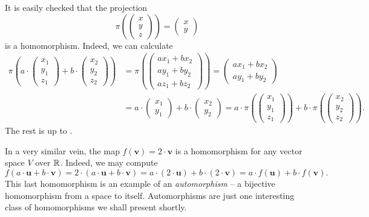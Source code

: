 It is easily checked that the projection
\[
 \pi \left( 
  \begin{pmatrix}
   x\\
   y\\
   z
  \end{pmatrix}
 \right) = 
 \begin{pmatrix}
  x\\
  y
 \end{pmatrix}
\]
is a homomorphism. Indeed, we can calculate
\begin{align*}
 \pi \left( a \cdot 
 \begin{pmatrix}
  x_1\\
  y_1\\
  z_1
 \end{pmatrix} + b \cdot 
 \begin{pmatrix}
  x_2\\
  y_2\\
  z_2
 \end{pmatrix}
\right) &= 
 \pi \left( 
 \begin{pmatrix}
  ax_1 + bx_2\\
  ay_1 + by_2\\
  az_1 + bz_2
 \end{pmatrix}
 \right) = 
 \begin{pmatrix}
  ax_1 + bx_2\\
  ay_1 + by_2
 \end{pmatrix}
 \\
        &=a \cdot 
 \begin{pmatrix}
  x_1\\
  y_1
 \end{pmatrix}
 + b \cdot 
 \begin{pmatrix}
  x_2\\
  y_2
 \end{pmatrix} = 
 a \cdot \pi
 \left( 
 \begin{pmatrix}
  x_1\\
  y_1\\
  z_1
 \end{pmatrix}
 \right) + b \cdot \pi \left( 
 \begin{pmatrix}
  x_2\\
  y_2\\
  z_2
 \end{pmatrix}
 \right).
\end{align*}
The rest is up to .

In a very similar vein, the map $f(\mathbf{v}) = 2 \cdot \mathbf{v}$ is a
homomorphism for any vector space $V$ over $\mathbb{R}$. Indeed, we may compute
\[
 f(a \cdot \mathbf{u} + b \cdot \mathbf{v}) = 2 \cdot (a \cdot \mathbf{u} + b
 \cdot \mathbf{v}) = a \cdot (2 \cdot \mathbf{u}) + b \cdot (2 \cdot \mathbf{v})
 = a \cdot f(\mathbf{u}) + b \cdot f(\mathbf{v}).
\]
This last homomorphism is an example of an \emph{automorphism} -- a bijective
homomorphism from a space to itself. Automorphisms are just one interesting
class of homomorphisms we shall present shortly.


